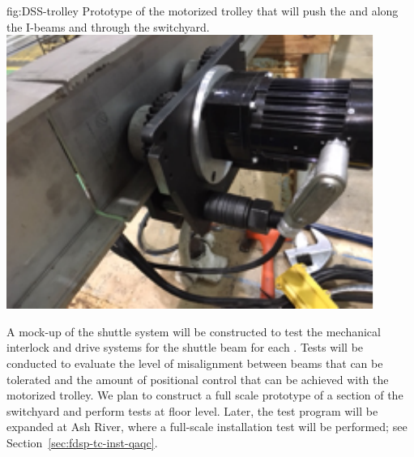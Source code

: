 \begin{dunefigure}{fig:DSS-trolley}
  {Prototype of the motorized  trolley that will push the  and  along the I-beams and through the switchyard.}
\includegraphics[width=.49\textwidth]{graphics/DSS-trolley.pdf}
\end{dunefigure}



A mock-up of the shuttle system will be constructed to test the mechanical interlock and drive systems for the shuttle beam for each .  
Tests will be conducted to evaluate the level of misalignment between beams that can be tolerated and the amount of positional control that can be achieved with the motorized trolley. 
We plan to construct a full scale prototype of a section of the  switchyard and perform tests at floor level. 
Later, the test program will be expanded at Ash River, where a full-scale installation test will be performed; see Section~\ref{sec:fdsp-tc-inst-qaqc}.
